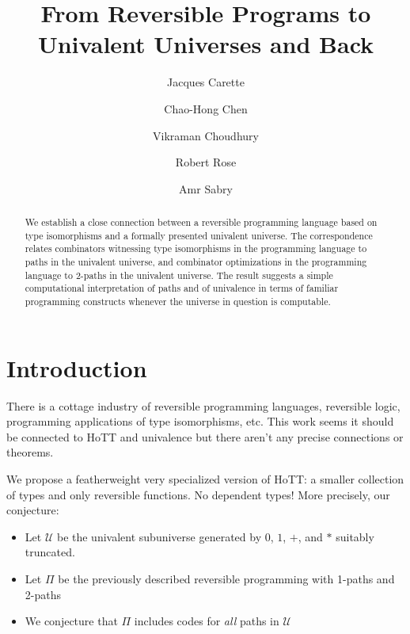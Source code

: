 \documentclass{entcs}
\begin{document}
\begin{frontmatter}
\title{From Reversible Programs to \\ Univalent Universes and Back}
\author{Jacques Carette}
\address{McMaster University}
\author{Chao-Hong Chen}
\address{Indiana University}
\author{Vikraman Choudhury}
\author{Robert Rose}
\author{Amr Sabry}
\address{Indiana University}

\begin{abstract}
  We establish a close connection between a reversible programming language
  based on type isomorphisms and a formally presented univalent universe. The
  correspondence relates combinators witnessing type isomorphisms in the
  programming language to paths in the univalent universe, and combinator
  optimizations in the programming language to 2-paths in the univalent
  universe. The result suggests a simple computational interpretation of paths
  and of univalence in terms of familiar programming constructs whenever the
  universe in question is computable.
\end{abstract}

\end{frontmatter}

\section{Introduction}

There is a cottage industry of reversible programming languages, reversible
logic, programming applications of type isomorphisms, etc. This work seems it
should be connected to HoTT and univalence but there aren't any precise
connections or theorems.

We propose a featherweight very specialized version of HoTT: a smaller
collection of types and only reversible functions. No dependent types!  More
precisely, our conjecture:

\begin{itemize}
\item Let $\mathcal{U}$ be the univalent subuniverse generated by $0$, $1$, $+$,
  and $*$ suitably truncated.
\item Let $\Pi$ be the previously  described reversible programming with 1-paths and 2-paths
\item We conjecture that $\Pi$ includes codes for \emph{all} paths in $\mathcal{U}$
\end{itemize}
\end{document}
